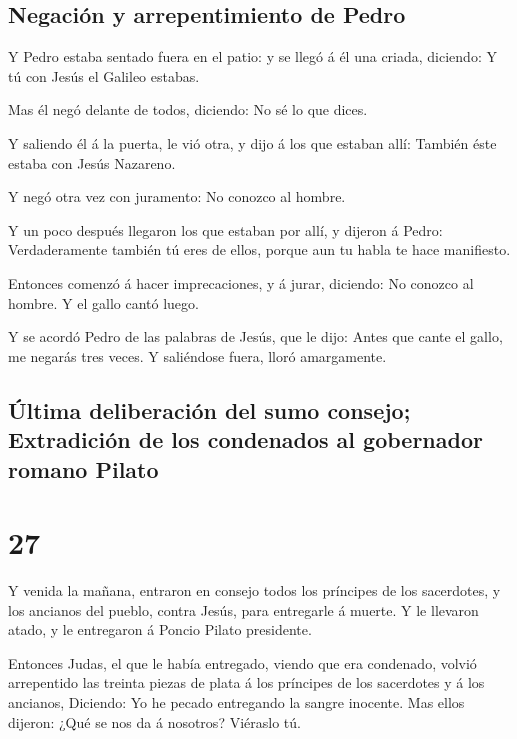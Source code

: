 \hypertarget{negaciuxf3n-y-arrepentimiento-de-pedro}{%
\subsection{Negación y arrepentimiento de
Pedro}\label{negaciuxf3n-y-arrepentimiento-de-pedro}}

 Y Pedro estaba sentado fuera en el patio: y se llegó á
él una criada, diciendo: Y tú con Jesús el Galileo estabas.

 Mas él negó delante de todos, diciendo: No sé lo que
dices.

 Y saliendo él á la puerta, le vió otra, y dijo á los que
estaban allí: También éste estaba con Jesús Nazareno.

 Y negó otra vez con juramento: No conozco al hombre.

 Y un poco después llegaron los que estaban por allí, y
dijeron á Pedro: Verdaderamente también tú eres de ellos, porque aun tu
habla te hace manifiesto.

 Entonces comenzó á hacer imprecaciones, y á jurar,
diciendo: No conozco al hombre. Y el gallo cantó luego.

 Y se acordó Pedro de las palabras de Jesús, que le dijo:
Antes que cante el gallo, me negarás tres veces. Y saliéndose fuera,
lloró amargamente.

\hypertarget{uxfaltima-deliberaciuxf3n-del-sumo-consejo-extradiciuxf3n-de-los-condenados-al-gobernador-romano-pilato}{%
\subsection{Última deliberación del sumo consejo; Extradición de los
condenados al gobernador romano
Pilato}\label{uxfaltima-deliberaciuxf3n-del-sumo-consejo-extradiciuxf3n-de-los-condenados-al-gobernador-romano-pilato}}

\hypertarget{section-26}{%
\section{27}\label{section-26}}

 Y venida la mañana, entraron en consejo todos los
príncipes de los sacerdotes, y los ancianos del pueblo, contra Jesús,
para entregarle á muerte.  Y le llevaron atado, y le
entregaron á Poncio Pilato presidente.

 Entonces Judas, el que le había entregado, viendo que era
condenado, volvió arrepentido las treinta piezas de plata á los
príncipes de los sacerdotes y á los ancianos,  Diciendo:
Yo he pecado entregando la sangre inocente. Mas ellos dijeron: ¿Qué se
nos da á nosotros? Viéraslo tú.

